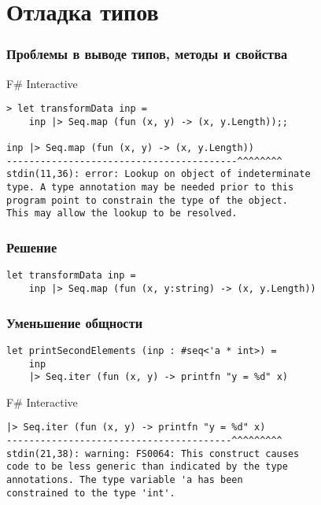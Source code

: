 \documentclass[xetex,mathserif,serif]{beamer}
\begin{document}
    \section{Отладка типов}

    \begin{frame}[fragile]
        \frametitle{Проблемы в выводе типов, методы и свойства}
        \begin{alertblock}{F\# Interactive}
            \begin{verbatim}
> let transformData inp =
    inp |> Seq.map (fun (x, y) -> (x, y.Length));;

inp |> Seq.map (fun (x, y) -> (x, y.Length))
-----------------------------------------^^^^^^^^
stdin(11,36): error: Lookup on object of indeterminate 
type. A type annotation may be needed prior to this 
program point to constrain the type of the object. 
This may allow the lookup to be resolved.
            \end{verbatim}
        \end{alertblock}
    \end{frame}

    \begin{frame}[fragile]
        \frametitle{Решение}
        \begin{verbatim}
let transformData inp =
    inp |> Seq.map (fun (x, y:string) -> (x, y.Length))
        \end{verbatim}
    \end{frame}

    \begin{frame}[fragile]
        \frametitle{Уменьшение общности}
        \begin{verbatim}
let printSecondElements (inp : #seq<'a * int>) =
    inp
    |> Seq.iter (fun (x, y) -> printfn "y = %d" x)
        \end{verbatim}

        \begin{alertblock}{F\# Interactive}
            \begin{verbatim}
|> Seq.iter (fun (x, y) -> printfn "y = %d" x)
----------------------------------------^^^^^^^^^
stdin(21,38): warning: FS0064: This construct causes 
code to be less generic than indicated by the type 
annotations. The type variable 'a has been 
constrained to the type 'int'.
            \end{verbatim}
        \end{alertblock}
    \end{frame}
\end{document}
